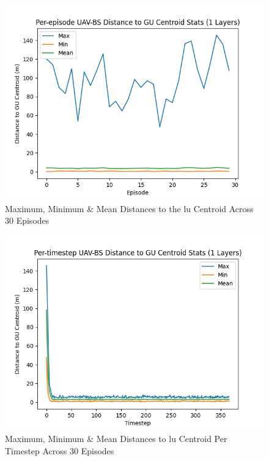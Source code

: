 \begin{figure} [ht!]
    \centering
    \includegraphics[width=0.75\linewidth]{figures/eve_test1/1_episode_distance_to_centroid.png}
    \caption{Maximum, Minimum \& Mean Distances to the \acrshort{lu} Centroid Across 30 Episodes}
    \label{fig:episode_dist_to_centroid}
\end{figure}
\begin{figure} [ht!]
    \centering
    \includegraphics[width=0.75\linewidth]{figures/eve_test1/1_timestep_distance_to_centroid.png}
    \caption{Maximum, Minimum \& Mean Distances to \acrshort{lu} Centroid Per Timestep Across 30 Episodes}
    \label{fig:timestep_dist_to_centroid}
\end{figure}
